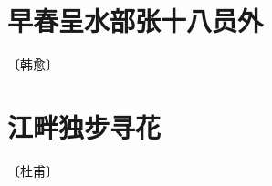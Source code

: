 \documentclass[12pt,UTF-8,openany]{ctexbook}
\begin{document}
\vspace{8pt}


\section{早春呈水部张十八员外}

\begin{center}
    \vspace{10pt}
    
    \begin{normalsize}
        
        〔韩愈〕
        
    \end{normalsize}
    
    \vspace{8pt}
    
    \begin{large}
        
        
        
    \end{large}
    
\end{center}

\vspace{8pt}


\section{江畔独步寻花}

\begin{center}
    \vspace{10pt}
    
    \begin{normalsize}
        
        〔杜甫〕
        
    \end{normalsize}
    
    \vspace{8pt}
    
    \begin{large}
        
        
        
    \end{large}
    
\end{center}
\end{document}
